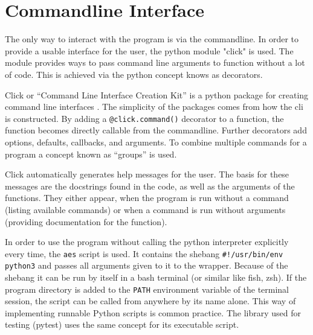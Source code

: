 \chapter{Commandline Interface}
\label{commandline_interface}
The only way to interact with the program is via the commandline. In order to provide a usable interface for the user, the python module "click" is used. The module provides ways to pass command line arguments to function without a lot of code. This is achieved via the python concept knows as decorators.

Click or \enquote{Command Line Interface Creation Kit} is a python package for creating command line interfaces \cite{click}. The simplicity of the packages comes from how the cli is constructed. By adding a \lstinline{@click.command()} decorator to a function, the function becomes directly callable from the commandline. Further decorators add options, defaults, callbacks, and arguments. To combine multiple commands for a program a concept known as \enquote{groups} is used.

Click automatically generates help messages for the user. The basis for these messages are the docstrings found in the code, as well as the arguments of the functions. They either appear, when the program is run without a command (listing available commands) or when a command is run without arguments (providing documentation for the function).

In order to use the program without calling the python interpreter explicitly every time, the \lstinline|aes| script is used. It contains the shebang \lstinline|#!/usr/bin/env python3| and passes all arguments given to it to the wrapper. Because of the shebang it can be run by itself in a bash terminal (or similar like fish, zsh). If the program directory is added to the \lstinline|PATH| environment variable of the terminal session, the script can be called from anywhere by its name alone. This way of implementing runnable Python scripts is common practice. The library used for testing (pytest) uses the same concept for its executable script.
